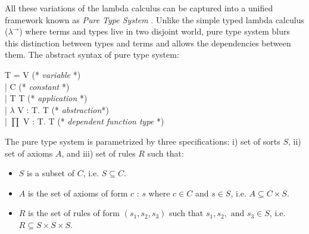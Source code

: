 All these variations of the lambda calculus can be captured into a unified framework
known as \textit{Pure Type System} \citep{berardi1988towards} 
\citep{Barendregt:1993:LCT:162552.162561}.  Unlike the simple typed lambda calculus ($\lambda^{\to}$) where 
terms and types live in two disjoint world,  pure type system blurs this distinction between 
types and terms and  allows the dependencies between them.  
The abstract syntax  of pure type system:
 \begin{displayquote}

    T = V   (* \textit{variable} *)\\
       |  C   (* \textit{constant} *)\\
       | T T (* \textit{application} *)\\
       | $\lambda$ V : T. T (* \textit{abstraction}*) \\
       | $\prod$ V : T. T  (* \textit{dependent function type} *)
   \end{displayquote}

\noindent
The pure type system is parametrized by three specifications: 
i) set of sorts $S$, ii) set of axioms $A$, and iii) set of rules $R$ such that: 

 \begin{itemize}
	\item $S$ is a subset of  $C$, i.e.  $S \subseteq C$. 
	\item $A$ is the set of axioms of form $c$ : $s$ where $c \in C$ and $s \in S$, i.e.  $A \subseteq C \times S$. 
	\item $R$ is the set of rules of form $(s_{1}, s_{2}, s_{3})$ such that $s_{1}, s_{2}, \text{ and } s_{3} \in S$, i.e.
	 $R \subseteq S \times S \times S$.
 
 \end{itemize}
 

